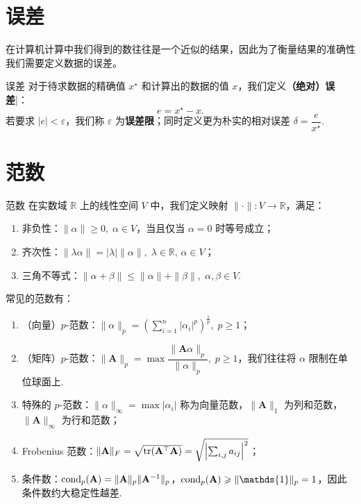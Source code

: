 \section{误差}
在计算机计算中我们得到的数往往是一个近似的结果，因此为了衡量结果的准确性我们需要定义数据的误差。
\begin{definition}{误差}
    对于待求数据的精确值 $x^\star$ 和计算出的数据的值 $x$，我们定义{\bf （绝对）误差}|：
    \[
        e = x^\star - x.
    \]
    若要求 $|e|<\varepsilon$，我们称 $\varepsilon$ 为{\bf 误差限}；同时定义更为朴实的相对误差 $\delta = \dfrac{e}{x^\star}$.
\end{definition}

\section{范数}
\begin{definition}{范数}
    在实数域 $\mathbb{R}$ 上的线性空间 $V$ 中，我们定义映射 $\| \cdot \| :V\to \mathbb{R}$，满足：
    \begin{enumerate}
        \item 非负性：$\|\alpha\| \geqslant 0,\; \alpha \in V$，当且仅当 $\alpha =0$ 时等号成立；
        \item 齐次性：$\|\lambda \alpha\| =|\lambda|\|\alpha \|,\; \lambda \in \mathbb{R},\, \alpha \in V$；
        \item 三角不等式：$\|\alpha+\beta\|\leqslant \|\alpha\|+\|\beta\|,\; \alpha,\beta \in V$.
    \end{enumerate}
\end{definition}

常见的范数有：
\begin{enumerate}
    \item （向量）$p$-范数：$\|\alpha\|_p = \left(\sum_{i=1}^n |\alpha_i|^p\right)^{\frac{1}{p}},\; p\geqslant 1$；
    \item （矩阵）$p$-范数：$\|\mathbf{A}\|_p = \max\dfrac{\|\mathbf{A}\alpha\|_p}{\|\alpha\|_p},\; p\geqslant 1$，我们往往将 $\alpha$ 限制在单位球面上.
    \item 特殊的 $p$-范数：$\|\alpha\|_{\infty} = \max |\alpha_i|$ 称为向量范数，$\|\mathbf{A}\|_1 $ 为列和范数，$\|\mathbf{A}\|_\infty$ 为行和范数；
    \item Frobenius 范数：$\|\mathbf{A}\|_F = \sqrt{\tr(\mathbf{A}^\top\mathbf{A})} = \sqrt{\left|\sum_{i,j} a_{ij}\right|^2}$；
    \item 条件数：$\operatorname{cond}_p (\mathbf{A} ) = \|\mathbf{A}\|_p \|\mathbf{A}^{-1}\|_p$，$\cond_p (\mathbf{A}) \geqslant \|\mathds{1}\|_p= 1$，因此条件数约大稳定性越差.
\end{enumerate}

